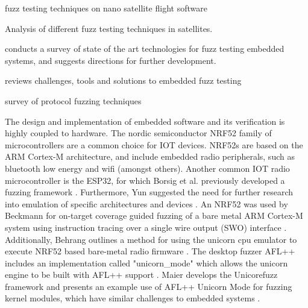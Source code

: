 \documentclass[../report.tex]{subfiles}
\begin{document}

\citet{Gutierrez_2021} fuzz testing techniques on nano satellite flight software

\citet{Willbold_2024} Analysis of different fuzz testing techniques in satellites.



\citet{Yun_2022} conducts a survey of state of the art technologies for fuzz testing embedded systems, and suggests directions for further development.

\citet{Eisele_et_al_2022} reviews challenges, tools and solutions to embedded fuzz testing


\citet{Zhang_2024} survey of protocol fuzzing techniques




The design and implementation of embedded software and its verification is
highly coupled to hardware. The nordic semiconductor NRF52 family of
microcontrollers are a common choice for IOT devices. NRF52s are based on the
ARM Cortex-M architecture, and include embedded radio peripherals, such as
bluetooth low energy and wifi (amongst others). Another common IOT radio
microcontroller is the ESP32, for which Borsig et al. previously developed a
fuzzing framework \citep{Borsig_2020}. Furthermore, Yun suggested the need for
further research into emulation of specific architectures and devices
\citep{Yun_2022}. An NRF52 was used by Beckmann for on-target coverage guided
fuzzing of a bare metal ARM Cortex-M system using instruction tracing over a
single wire output (SWO) interface \citep{Beckmann_2023}. Additionally, Behrang
outlines a method for using the unicorn cpu emulator to execute NRF52 based
bare-metal radio firmware \citep{Behrang_2023}. The desktop fuzzer AFL++
includes an implementation called "unicorn\_mode" which allows the unicorn
engine to be built with AFL++ support \citep{UnicornMode}. Maier develops the
Unicorefuzz framework and presents an example use of AFL++ Unicorn Mode for
fuzzing kernel modules, which have similar challenges to embedded systems
\citep{Maier_2019}.
\end{document}
